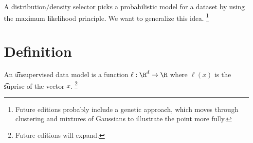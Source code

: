 
A distribution/density selector picks a probabilistic model for a dataset by using the maximum likelihood principle.
We want to generalize this idea.
  \ifhmode\unskip\fi\footnote{
Future editions probably include a genetic approach, which moves through clustering and mixtures of Gaussians to illustrate the point more fully.
  }

\section{Definition}

An \t{unsupervised data model} is a function $\ell : \R ^d \to \R $ where $\ell (x)$ is the \t{suprise} of the vector $x$.
  \ifhmode\unskip\fi\footnote{
Future editions will expand.
  }

\blankpage
